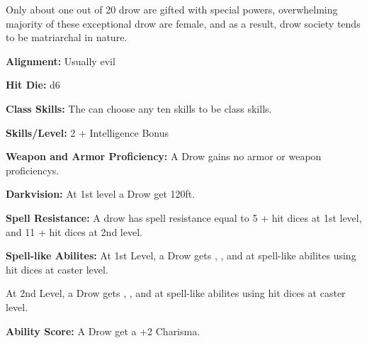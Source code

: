 
Only about one out of 20 drow are gifted with special powers, overwhelming majority of these exceptional drow are female, and as a result, drow society tends to be matriarchal in nature.

\textbf{Alignment:} Usually evil

\textbf{Hit Die:} d6

\textbf{Class Skills:} The \currentclassname{} can choose any ten skills to be class skills.

\textbf{Skills/Level:} 2 + Intelligence Bonus

\modebab{}
\poorfor{}
\goodref{}
\poorwil{}

\begin{classtable}
\end{classtable}

\classfeatures

\textbf{Weapon and Armor Proficiency:} A Drow gains no armor or weapon proficiencys.

\textbf{Darkvision:} At 1st level a Drow get  120ft.

\textbf{Spell Resistance:} A drow has spell resistance equal to 5 + hit dices at 1st level, and 11 + hit dices at 2nd level.

\textbf{Spell-like Abilites:} At 1st Level, a Drow gets , , and  at spell-like abilites using hit dices at caster level.

At 2nd Level, a Drow gets , , and  at spell-like abilites using hit dices at caster level.

\textbf{Ability Score:} A Drow get a +2 Charisma.


